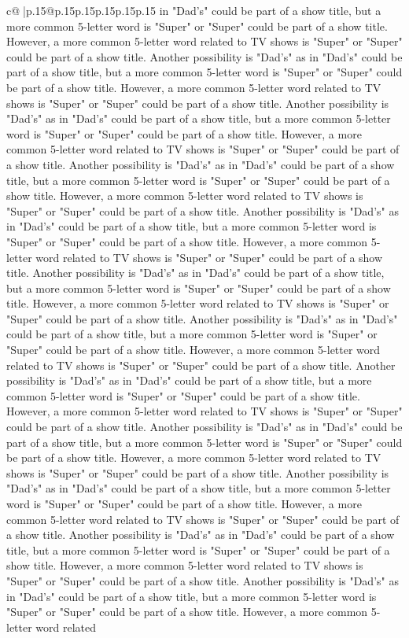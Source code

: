 \documentclass{article}
\begin{document}
{\begin{supertabular}{c@{$\;$}|p{.15\linewidth}@{}p{.15\linewidth}p{.15\linewidth}p{.15\linewidth}p{.15\linewidth}p{.15\linewidth}}
{{{in "Dad's" could be part of a show title, but a more common 5{-}letter word is "Super" or "Super" could be part of a show title. However, a more common 5{-}letter word related to TV shows is "Super" or "Super" could be part of a show title. Another possibility is "Dad's" as in "Dad's" could be part of a show title, but a more common 5{-}letter word is "Super" or "Super" could be part of a show title. However, a more common 5{-}letter word related to TV shows is "Super" or "Super" could be part of a show title. Another possibility is "Dad's" as in "Dad's" could be part of a show title, but a more common 5{-}letter word is "Super" or "Super" could be part of a show title. However, a more common 5{-}letter word related to TV shows is "Super" or "Super" could be part of a show title. Another possibility is "Dad's" as in "Dad's" could be part of a show title, but a more common 5{-}letter word is "Super" or "Super" could be part of a show title. However, a more common 5{-}letter word related to TV shows is "Super" or "Super" could be part of a show title. Another possibility is "Dad's" as in "Dad's" could be part of a show title, but a more common 5{-}letter word is "Super" or "Super" could be part of a show title. However, a more common 5{-}letter word related to TV shows is "Super" or "Super" could be part of a show title. Another possibility is "Dad's" as in "Dad's" could be part of a show title, but a more common 5{-}letter word is "Super" or "Super" could be part of a show title. However, a more common 5{-}letter word related to TV shows is "Super" or "Super" could be part of a show title. Another possibility is "Dad's" as in "Dad's" could be part of a show title, but a more common 5{-}letter word is "Super" or "Super" could be part of a show title. However, a more common 5{-}letter word related to TV shows is "Super" or "Super" could be part of a show title. Another possibility is "Dad's" as in "Dad's" could be part of a show title, but a more common 5{-}letter word is "Super" or "Super" could be part of a show title. However, a more common 5{-}letter word related to TV shows is "Super" or "Super" could be part of a show title. Another possibility is "Dad's" as in "Dad's" could be part of a show title, but a more common 5{-}letter word is "Super" or "Super" could be part of a show title. However, a more common 5{-}letter word related to TV shows is "Super" or "Super" could be part of a show title. Another possibility is "Dad's" as in "Dad's" could be part of a show title, but a more common 5{-}letter word is "Super" or "Super" could be part of a show title. However, a more common 5{-}letter word related to TV shows is "Super" or "Super" could be part of a show title. Another possibility is "Dad's" as in "Dad's" could be part of a show title, but a more common 5{-}letter word is "Super" or "Super" could be part of a show title. However, a more common 5{-}letter word related to TV shows is "Super" or "Super" could be part of a show title. Another possibility is "Dad's" as in "Dad's" could be part of a show title, but a more common 5{-}letter word is "Super" or "Super" could be part of a show title. However, a more common 5{-}letter word related }}}
\end{supertabular}}
\end{document}
